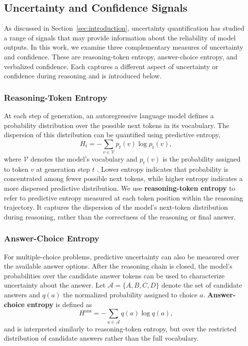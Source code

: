 \documentclass{article}
\begin{document}
\subsection{Uncertainty and Confidence Signals}

As discussed in Section~\ref{sec:introduction}, uncertainty quantification has studied a range of signals that may provide information about the reliability of model outputs. In this work, we examine three complementary measures of uncertainty and confidence. These are reasoning-token entropy, answer-choice entropy, and verbalized confidence. Each captures a different aspect of uncertainty or confidence during reasoning and is introduced below.

\subsubsection{Reasoning-Token Entropy}

At each step of generation, an autoregressive language model defines a probability distribution over the possible next tokens in its vocabulary. The dispersion of this distribution can be quantified using predictive entropy,
\begin{equation}
H_t = -\sum_{v \in \mathcal{V}} p_t(v) \log p_t(v),
\end{equation}
where $\mathcal{V}$ denotes the model's vocabulary and $p_t(v)$ is the probability assigned to token $v$ at generation step $t$ \cite{geng2024survey}. Lower entropy indicates that probability is concentrated among fewer possible next tokens, while higher entropy indicates a more dispersed predictive distribution. We use \textbf{reasoning-token entropy} to refer to predictive entropy measured at each token position within the reasoning trajectory. It captures the dispersion of the model's next-token distribution during reasoning, rather than the correctness of the reasoning or final answer.


\subsubsection{Answer-Choice Entropy}

For multiple-choice problems, predictive uncertainty can also be measured over the available answer options. After the reasoning chain is closed, the model's probabilities over the candidate answer tokens can be used to characterize uncertainty about the answer. Let $\mathcal{A} = \{A, B, C, D\}$ denote the set of candidate answers and $q(a)$ the normalized probability assigned to choice $a$. \textbf{Answer-choice entropy} is defined as
\begin{equation}
H^{\mathrm{ans}} = -\sum_{a \in \mathcal{A}} q(a) \log q(a),
\end{equation}
and is interpreted similarly to reasoning-token entropy, but over the restricted distribution of candidate answers rather than the full vocabulary.
\end{document}
